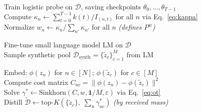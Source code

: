 \documentclass[12pt, a4paper, twoside]{book}
\numberwithin{equation}{chapter}
\theoremstyle{plain}
\theoremstyle{definition}
\theoremstyle{remark}
\begin{document}
\begin{center}
  \begin{minipage}{0.99\linewidth}
    \begin{algorithm}[H]

      \caption{Trajectory-Aware Knowledge Estimation (\textbf{TAKE}).}
      \label{alg:take}


      \vspace{-0.5\baselineskip}
      \Comment{\noindent\hrulefill}

      \vspace{0.5\baselineskip}
      Train logistic probe on $\mathcal{D}$, saving checkpoints $\theta_0, \ldots, \theta_{T-1}$ \\
      Compute $\kappa_n \leftarrow \textstyle\sum_{t=0}^{T-1} k(t) / I_{(n,t)}$ for all $n$ \hfill via Eq.~\ref{eq:kappa} \\
      Normalize $w_n \leftarrow \kappa_n / \sum_{n'} \kappa_{n'}$ for all $n$ \hfill\textit{(defines $P^w$)}

      \vspace{0.5\baselineskip}
      Fine-tune small language model $\text{LM}$ on $\mathcal{D}$ \\
      Sample synthetic pool $\mathcal{D}_\text{synth} = \{\tilde{z}_c\}_{c=1}^{M}$ from $\text{LM}$

      \vspace{0.5\baselineskip}
      Embed: $\phi(z_n)$ for $n \in [N]$; $\phi(\tilde{z}_c)$ for $c \in [M]$ \\
      Compute cost matrix $C_{nc} = \|\phi(z_n) - \phi(\tilde{z}_c)\|^2$ \\
      Solve $\gamma^* \leftarrow \text{Sinkhorn}(C, w, \mathbf{1}/M, \varepsilon)$ \hfill via Eq.~\ref{eq:ot} \\
      Distill $\tilde{\mathcal{D}} \leftarrow \text{top}\text{-}K\!\left(\{\tilde{z}_c\},\; \textstyle\sum_n \gamma^*_{nc}\right)$ \hfill\textit{(by received mass)}

      \vspace{0.5\baselineskip}
    \end{algorithm}
  \end{minipage}
\end{center}
\end{document}
